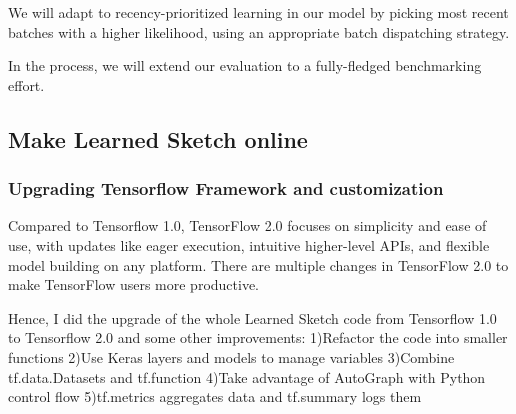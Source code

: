 We will adapt to recency-prioritized learning in our model by picking most recent batches with a higher likelihood, using an appropriate batch dispatching strategy.

In the process, we will extend our evaluation to a fully-fledged benchmarking effort.


\subsection{Make Learned Sketch online}

\subsubsection{Upgrading Tensorflow Framework and customization}
% 
% 


Compared to Tensorflow 1.0, TensorFlow 2.0 focuses on simplicity and ease of use, with updates like eager execution, intuitive higher-level APIs, and flexible model building on any platform. There are multiple changes in TensorFlow 2.0 to make TensorFlow users more productive.

Hence, I did the upgrade of the whole Learned Sketch code from Tensorflow 1.0 to Tensorflow 2.0 and some other improvements: 1)Refactor the code into smaller functions 2)Use Keras layers and models to manage variables 3)Combine tf.data.Datasets and tf.function 4)Take advantage of AutoGraph with Python control flow 5)tf.metrics aggregates data and tf.summary logs them 

% 

